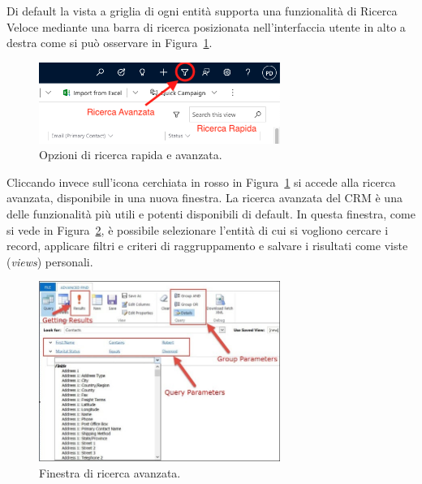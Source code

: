 Di default la vista a griglia di ogni entità supporta una funzionalità di Ricerca Veloce mediante una barra di ricerca posizionata nell'interfaccia utente in alto a destra come si può osservare in Figura~\ref{fig:quickSearch}.
\begin{figure}[ht]
  \centering
  \includegraphics[width=0.7\textwidth]{quick-search.png}
  \caption{Opzioni di ricerca rapida e avanzata.}
  \label{fig:quickSearch}
\end{figure}

Cliccando invece sull'icona cerchiata in rosso in Figura~\ref{fig:quickSearch} si accede alla ricerca avanzata, disponibile in una nuova finestra. La ricerca avanzata del CRM è una delle funzionalità più utili e potenti disponibili di default. In questa finestra, come si vede in Figura~\ref{fig:advancedSearch}, è possibile selezionare l'entità di cui si vogliono cercare i record, applicare filtri e criteri di raggruppamento e salvare i risultati come viste (\textit{views}) personali.~\cite{DynamicsTutorialspoint}
\begin{figure}[ht]
  \centering
  \includegraphics[width=0.7\textwidth]{advanced-search.png}
  \caption{Finestra di ricerca avanzata.}
  \label{fig:advancedSearch}
\end{figure}

